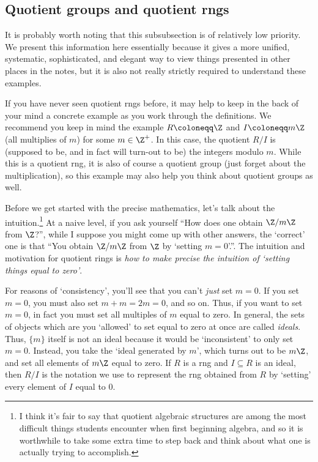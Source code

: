 \subsection{Quotient groups and quotient rngs}

It is probably worth noting that this subsubsection is of relatively low priority.  We present this information here essentially because it gives a more unified, systematic, sophisticated, and elegant way to view things presented in other places in the notes, but it is also not really strictly required to understand these examples.

If you have never seen quotient rngs before, it may help to keep in the back of your mind a concrete example as you work through the definitions.  We recommend you keep in mind the example $R\coloneqq \Z$ and $I\coloneqq m\Z$ (all multiplies of $m$) for some $m\in \Z ^+$.  In this case, the quotient $R/I$ is (supposed to be, and in fact will turn-out to be) the integers modulo $m$.  While this is a quotient rng, it is also of course a quotient group (just forget about the multiplication), so this example may also help you think about quotient groups as well.

Before we get started with the precise mathematics, let's talk about the intuition.\footnote{I think it's fair to say that quotient algebraic structures are among the most difficult things students encounter when first beginning algebra, and so it is worthwhile to take some extra time to step back and think about what one is actually trying to accomplish.}  At a naive level, if you ask yourself ``How does one obtain $\Z /m\Z$ from $\Z$?'', while I suppose you might come up with other answers, the `correct' one is that ``You obtain $\Z /m\Z$ from $\Z$ by `setting $m=0$'.''.  The intuition and motivation for quotient rings is \emph{how to make precise the intuition of `setting things equal to zero'}.

For reasons of `consistency', you'll see that you can't \emph{just} set $m=0$.  If you set $m=0$, you must also set $m+m=2m=0$, and so on.  Thus, if you want to set $m=0$, in fact you must set all multiples of $m$ equal to zero.  In general, the sets of objects which are you `allowed' to set equal to zero at once are called \emph{ideals}.  Thus, $\{ m\}$ itself is not an ideal because it would be `inconsistent' to only set $m=0$.  Instead, you take the `ideal generated by $m$', which turns out to be $m\Z$, and set all elements of $m\Z$ equal to zero.  If $R$ is a rng and $I\subseteq R$ is an ideal, then $R/I$ is the notation we use to represent the rng obtained from $R$ by `setting' every element of $I$ equal to $0$.

